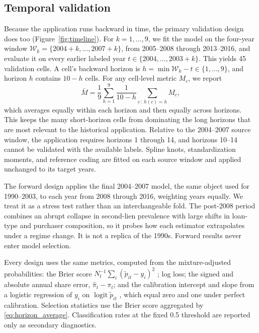 \documentclass[letterpaper,12pt,usenames,dvipsnames]{article}
\theoremstyle{definition}
\begin{document}
\subsection{Temporal validation}\label{sec:est_validation}

Because the application runs backward in time, the primary validation design does too
(Figure~\ref{fig:timeline}). For $k = 1, \ldots, 9$, we fit the model on the four-year window
$\mathcal{W}_k = \{2004 + k, \ldots, 2007 + k\}$, from 2005--2008 through 2013--2016, and
evaluate it on every earlier labeled year $t \in \{2004, \ldots, 2003 + k\}$. This yields 45
validation cells. A cell's backward horizon is $h = \min \mathcal{W}_k - t \in \{1, \ldots,
9\}$, and horizon $h$ contains $10 - h$ cells. For any cell-level metric $M_c$, we report
\begin{equation}
	\bar{M} = \frac{1}{9} \sum_{h=1}^{9} \frac{1}{10 - h}
	\sum_{c \,:\, h(c) = h} M_c ,
	\label{eq:horizon_average}
\end{equation}
which averages equally within each horizon and then equally across horizons. This keeps the
many short-horizon cells from dominating the long horizons that are most relevant to the
historical application. Relative to the 2004--2007 source window, the application requires
horizons 1 through 14, and horizons 10--14 cannot be validated with the available labels. Spline
knots, standardization moments, and reference coding are fitted on each source window and
applied unchanged to its target years.

The forward design applies the final 2004--2007 model, the same object used for 1990--2003, to
each year from 2008 through 2016, weighting years equally. We treat it as a stress test rather
than an interchangeable fold. The post-2008 period combines an abrupt collapse in second-lien
prevalence with large shifts in loan-type and purchaser composition, so it probes how each
estimator extrapolates under a regime change. It is not a replica of the 1990s. Forward results
never enter model selection.

Every design uses the same metrics, computed from the mixture-adjusted probabilities: the Brier
score $N_t^{-1} \sum_i (\tilde{p}_{it} - y_i)^2$ \citep{brier1950verification}; log loss; the
signed and absolute annual share error, $\hat{\pi}_t - \pi_t$; and the calibration intercept and
slope from a logistic regression of $y_i$ on $\operatorname{logit} \tilde{p}_{it}$
\citep{cox1958two}, which equal zero and one under perfect calibration. Selection statistics
use the Brier score aggregated by \eqref{eq:horizon_average}. Classification rates at the fixed
0.5 threshold are reported only as secondary diagnostics.
\end{document}

